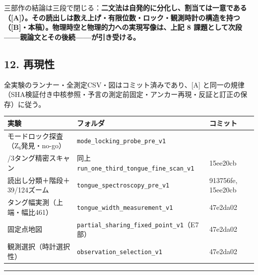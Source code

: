 \documentclass[
  a4paper,
]{ltjsarticle}
\newcounter{none} %
\begin{document}
三部作の結論は三段で閉じる：\textbf{二文法は自発的に分化し、割当ては一意である（{[}A{]}）。その読出しは数え上げ・有限位数・ロック・観測時計の構造を持つ（{[}B{]}・本稿）。物理時空と物理的力への実現写像は、上記
8 課題として次段------親論文とその後続------が引き受ける。}

\subsection{12. 再現性}\label{ux518dux73feux6027}

全実験のランナー・全測定CSV・図はコミット済みであり、{[}A{]}
と同一の規律（SHA検証付き中核参照・予言の測定前固定・アンカー再現・反証と訂正の保存）に従う。

{\def\LTcaptype{none} %
\begin{longtable}[]{@{}
  >{\raggedright\arraybackslash}p{}
  >{\raggedright\arraybackslash}p{}
  >{\raggedright\arraybackslash}p{}@{}}
\toprule\noalign{}
\begin{minipage}[b]{\linewidth}\raggedright
実験
\end{minipage} & \begin{minipage}[b]{\linewidth}\raggedright
フォルダ
\end{minipage} & \begin{minipage}[b]{\linewidth}\raggedright
コミット
\end{minipage} \\
\midrule\noalign{}
\endhead
\bottomrule\noalign{}
\endlastfoot
モードロック探査（Z₆発見・no-go） &
\texttt{mode\_locking\_probe\_pre\_v1} & 56453653 \\
1/3タング精密スキャン & 同上
\texttt{run\_one\_third\_tongue\_fine\_scan\_v1} & 15ee20cb \\
読出し分類＋階段＋39/124ズーム & \texttt{tongue\_spectroscopy\_pre\_v1}
& 913756fe, 15ee20cb \\
タング幅実測（上端・幅比461） & \texttt{tongue\_width\_measurement\_v1}
& 47e2da02 \\
固定点地図 & \texttt{partial\_sharing\_fixed\_point\_v1}（E7部） &
47e2da02 \\
観測選択（時計選択性） & \texttt{observation\_selection\_v1} &
47e2da02 \\
\end{longtable}
}

\begin{center}\rule{0.5\linewidth}{0.5pt}\end{center}
\end{document}
